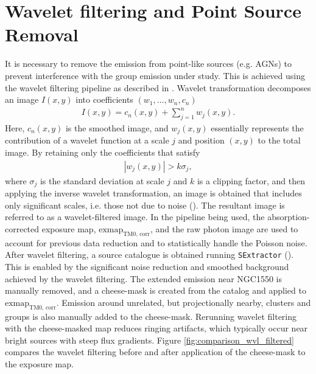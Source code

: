 \section{Wavelet filtering and Point Source Removal}
It is necessary to remove the emission from point-like sources (e.g. AGNs) to prevent interference with the group emission under study. This is achieved using the wavelet filtering pipeline as described in \cite{Pacaud2006}. Wavelet transformation decomposes an image \(I(x, y)\) into coefficients \((w_1, \ldots, w_n, c_n)\)
\begin{align*}
I(x, y) = c_n(x, y) + \sum_{j=1}^{n}w_j(x, y).    
\end{align*}
Here, \(c_n(x, y)\) is the smoothed image, and \(w_j(x, y)\) essentially represents the contribution of a wavelet function at a scale \(j\) and position \((x, y)\) to the total image. By retaining only the coefficients that satisfy
\begin{align*}
|w_j(x, y)| > k\sigma_j,
\end{align*}
where \(\sigma_j\) is the standard deviation at scale \(j\) and \(k\) is a clipping factor, and then applying the inverse wavelet transformation, an image is obtained that includes only significant scales, i.e. those not due to noise (\cite{Stark1998}). The resultant image is referred to as a wavelet-filtered image. In the pipeline being used, the absorption-corrected exposure map, \(\text{exmap}_\text{TM0, corr}\), and the raw photon image are used to account for previous data reduction and to statistically handle the Poisson noise. After wavelet filtering, a source catalogue is obtained running \texttt{SExtractor} (\cite{Bertin1996}). This is enabled by the significant noise reduction and smoothed background achieved by the wavelet filtering. The extended emission near NGC1550 is manually removed, and a cheese-mask is created from the catalog and applied to \(\text{exmap}_\text{TM0, corr}\). Emission around unrelated, but projectionally nearby, clusters and groups is also manually added to the cheese-mask. Rerunning wavelet filtering with the cheese-masked map reduces ringing artifacts, which typically occur near bright sources with steep flux gradients. Figure \ref{fig:comparison_wvl_filtered} compares the wavelet filtering before and after application of the cheese-mask to the exposure map.
%
